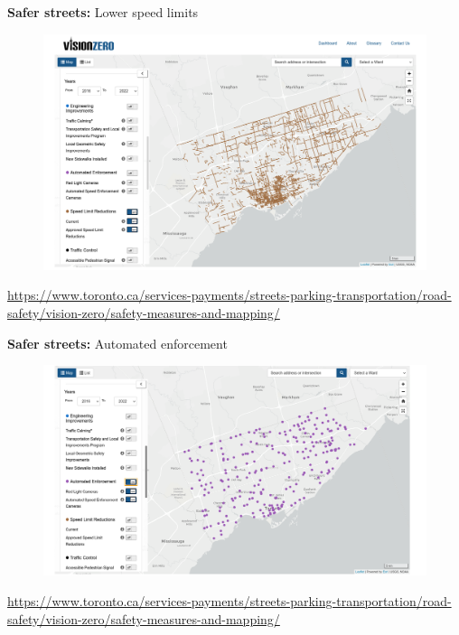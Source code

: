 \documentclass[aspectratio=169]{beamer}
\begin{document}
\begin{frame}
	
	\textbf{Safer streets:} Lower speed limits
	
	\begin{figure}
		\centering
		\includegraphics[width=0.75\linewidth]{images/speed_limit_reduction.png}
	\end{figure}

	\tiny\url{https://www.toronto.ca/services-payments/streets-parking-transportation/road-safety/vision-zero/safety-measures-and-mapping/}
	
\end{frame}




\begin{frame}
	
	\textbf{Safer streets:} Automated enforcement
	
	\begin{figure}
		\centering
		\includegraphics[width=0.75\linewidth]{images/automated_enforcement.png}
	\end{figure}
	
	\tiny\url{https://www.toronto.ca/services-payments/streets-parking-transportation/road-safety/vision-zero/safety-measures-and-mapping/}
	
\end{frame}
\end{document}
